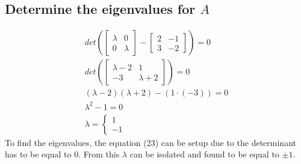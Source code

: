 \documentclass[12pt, a4paper]{article}
\begin{document}
		\subsection{Determine the eigenvalues for $A$}
			\begin{align}
				det\left(\begin{bmatrix}\lambda & 0\\0&\lambda\end{bmatrix}-\begin{bmatrix}2&-1\\3&-2\end{bmatrix}\right)=0\\
				det\left(\begin{bmatrix}\lambda-2 & 1\\-3&\lambda+2\end{bmatrix}\right)=0\\
				(\lambda-2)(\lambda+2)-(1\cdot (-3))=0\\
				\lambda^2-1=0\\
				\lambda=\left\{\begin{array}{c}1\\-1\end{array}\right.
			\end{align}
			To find the eigenvalues, the equation (23) can be setup due to the determinant has to be equal to 0. From this $\lambda$ can be isolated and found to be equal to $\pm 1$.
\end{document}
